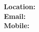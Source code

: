 \noindent \textbf{Location:   }\location  \\
\noindent \textbf{Email:      }\email   \\
\noindent \textbf{Mobile:     }\mobile \\
